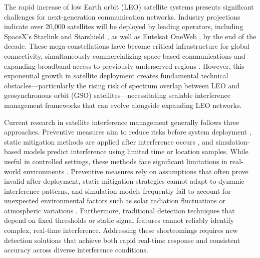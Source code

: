 \documentclass[conference]{IEEEtran}
\begin{document}
The rapid increase of low Earth orbit (LEO) satellite systems presents significant challenges for next-generation communication networks. Industry projections indicate over 20,000 satellites will be deployed by leading operators, including SpaceX's Starlink \cite{starlink} and Starshield \cite{spacex_starshield}, as well as Eutelsat OneWeb \cite{oneweb}, by the end of the decade. These mega-constellations have become critical infrastructure for global connectivity, simultaneously commercializing space-based communications and expanding broadband access to previously underserved regions \cite{reddyLowEarthOrbit2023}. However, this exponential growth in satellite deployment creates fundamental technical obstacles—particularly the rising risk of spectrum overlap between LEO and geosynchronous orbit (GSO) satellites—necessitating scalable interference management frameworks that can evolve alongside expanding LEO networks.

Current research in satellite interference management generally follows three approaches. Preventive measures aim to reduce risks before system deployment \cite{sharmaInlineInterferenceMitigation2016, liOptimalBeamPower2019}, static mitigation methods are applied after interference occurs \cite{wangCoFrequencyInterferenceAnalysis2020, zhangSpectralCoexistenceLEO2018}, and simulation-based models predict interference using limited time or location samples. While useful in controlled settings, these methods face significant limitations in real-world environments \cite{yunDynamicDownlinkInterference2023}. Preventive measures rely on assumptions that often prove invalid after deployment, static mitigation strategies cannot adapt to dynamic interference patterns, and simulation models frequently fail to account for unexpected environmental factors such as solar radiation fluctuations or atmospheric variations \cite{facskoSpaceWeatherEffects2023}. Furthermore, traditional detection techniques that depend on fixed thresholds or static signal features cannot reliably identify complex, real-time interference. Addressing these shortcomings requires new detection solutions that achieve both rapid real-time response and consistent accuracy across diverse interference conditions.
\end{document}
